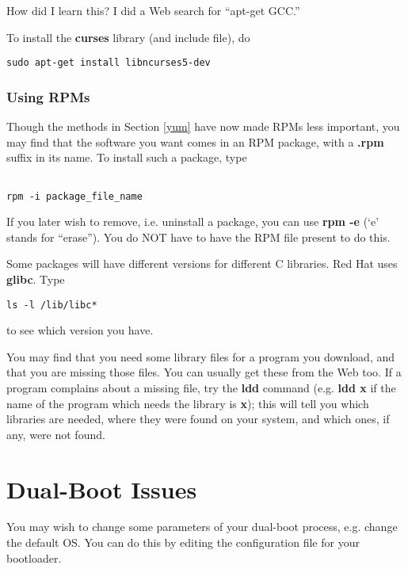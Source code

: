 \documentclass[11pt]{article}
\begin{document}
How did I learn this?  I did a Web search for ``apt-get GCC.''  

To install the {\bf curses} library (and include file), do

\begin{Verbatim}[fontsize=\relsize{-2}]
sudo apt-get install libncurses5-dev
\end{Verbatim}

\subsubsection{Using RPMs}

Though the methods in Section \ref{yum} have now made RPMs less
important, you may find that the software you want comes in an RPM
package, with a {\bf .rpm} suffix in its name.  To install such a
package, type

\begin{verbatim}

rpm -i package_file_name
\end{verbatim}

If you later wish to remove, i.e. uninstall a package, you can use {\bf
rpm -e} (`e' stands for ``erase''). You do NOT have to have the RPM file
present to do this.

Some packages will have different versions for different C libraries.
Red Hat uses {\bf glibc}. Type

\begin{verbatim}
ls -l /lib/libc*
\end{verbatim}

to see which version you have.

You may find that you need some library files for a program you
download, and that you are missing those files. You can usually get
these from the Web too. If a program complains about a missing file, try
the {\bf ldd} command (e.g. {\bf ldd x} if the name of the program which
needs the library is {\bf x}); this will tell you which libraries are
needed, where they were found on your system, and which ones, if any,
were not found.

\section{Dual-Boot Issues}

You may wish to change some parameters of your dual-boot process, e.g.
change the default OS.  You can do this by editing the configuration
file for your bootloader.
\end{document}
